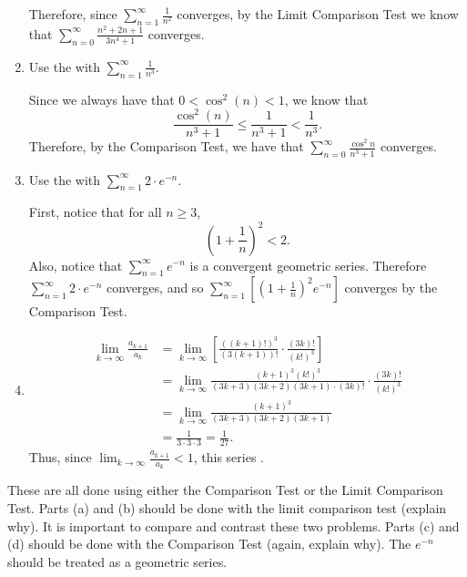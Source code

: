 \documentclass[]{ximera}
\begin{document}
\begin{problem}
\begin{freeResponse}
\begin{enumerate}
		Therefore, since $\sum_{n=1}^\infty \frac{1}{n^2}$ converges, by the Limit Comparison Test we know that $\sum_{n=0}^\infty \frac{n^2+2n+1}{3n^4+1}$ converges.
		
		
		
		\item  Use the  with $\sum_{n=1}^\infty \frac{1}{n^3}$.  
		
		Since we always have that $0 < \cos^2(n) < 1$, we know that
			\[
			\frac{\cos^2(n)}{n^3 + 1} \leq \frac{1}{n^3+1} < \frac{1}{n^3}.
			\]
		Therefore, by the Comparison Test, we have that $\sum_{n=0}^\infty \frac{\cos^2 n}{n^3+1}$ converges.
		
		
		
		\item  Use the  with $\sum_{n=1}^\infty 2 \cdot e^{-n}$.
		
		First, notice that for all $n \geq 3$,
			\[
			\left( 1 + \frac{1}{n} \right)^2 < 2.
			\]		
		Also, notice that $\sum_{n=1}^\infty e^{-n}$ is a convergent geometric series.  
		Therefore $\sum_{n=1}^\infty 2 \cdot e^{-n}$ converges, and so $\sum_{n=1}^\infty \left[ \left( 1+\frac{1}{n} \right)^2 e^{-n} \right]$ converges by the Comparison Test.
		

		\item {}
		\begin{align*}
			\lim_{k \to \infty} \frac{a_{k+1}}{a_k} 
			&= \lim_{k \to \infty} \left[ \frac{( (k+1)!)^3}{(3(k+1))!}  \cdot \frac{(3k)!}{(k!)^3} \right]  \\
			&= \lim_{k \to \infty} \frac{ (k+1)^3 (k!)^3}{(3k+3)(3k+2)(3k+1) \cdot (3k)!} \cdot \frac{(3k)!}{(k!)^3} \\
			&= \lim_{k \to \infty} \frac{(k+1)^3}{(3k+3)(3k+2)(3k+1)}  \\
			&= \frac{1}{3 \cdot 3 \cdot 3}= \frac{1}{27}.
			\end{align*}
		Thus, since $\lim_{k \to \infty} \frac{a_{k+1}}{a_k} < 1$, this series . 
		\end{enumerate}
	\end{freeResponse}

\end{problem}

\begin{instructorNotes}
These are all done using either the Comparison Test or the Limit Comparison Test.  
Parts (a) and (b) should be done with the limit comparison test (explain why).  
It is important to compare and contrast these two problems.  
Parts (c) and (d) should be done with the Comparison Test (again, explain why).  
The $e^{-n}$ should be treated as a geometric series.
\end{instructorNotes}
\end{document}
